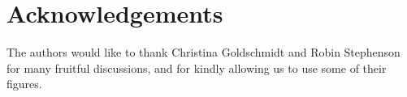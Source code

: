 \section*{Acknowledgements}
The authors would like to thank Christina Goldschmidt and Robin Stephenson for many fruitful discussions, and for kindly allowing us to use some of their figures.
